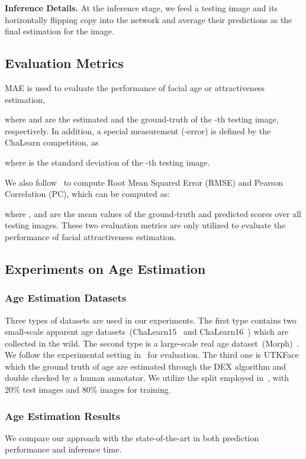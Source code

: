 \documentclass[5p,times,twocolumn]{elsarticle}
\begin{document}
\textbf{Inference Details.} At the inference stage, we feed a testing image and its horizontally flipping copy into the network and average their predictions as the final estimation for the image.
\vspace{-8pt}

\subsection{Evaluation Metrics}
MAE is used to evaluate the performance of facial age or attractiveness estimation,

where  and   are the estimated and the ground-truth of the -th testing image, respectively. In addition, a special measurement (-error) is defined by the ChaLearn competition, as

where  is the standard deviation of the -th testing image.

We also follow~\cite{xie2015scut,fan2017label} to compute Root Mean Squared Error (RMSE) and Pearson Correlation (PC), which can be computed as:


where , and  are the mean values of the ground-truth and predicted scores over all testing images. These two evaluation metrics are only utilized to evaluate the performance of facial attractiveness estimation. 

\subsection{Experiments on Age Estimation}\label{sec:eage}
\subsubsection{Age Estimation Datasets}
{Three} types of datasets are used in our experiments. The first type contains two small-scale apparent age datasets~(ChaLearn15~\cite{escalera2015chalearn} and ChaLearn16~\cite{escalera2016chalearn}) which are collected in the wild. The second type is a large-scale real age dataset~(Morph)~\cite{ricanek2006morph}. We follow the experimental setting in~\cite{gao2018dldlv2} for evaluation. {The third one is UTKFace~\cite{zhang2017age} which the ground truth of age are estimated through the DEX algorithm and double checked by a human annotator.} We utilize the split employed in~\cite{cao2020rank}, with 20\% test images and 80\% images for training. 


\subsubsection{Age Estimation Results}
We compare our approach with the state-of-the-art in both prediction performance and inference time. 
\end{document}
